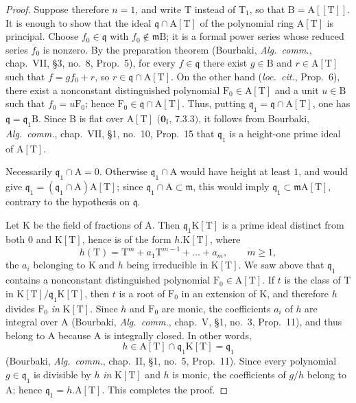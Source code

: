 \begin{proof}
Suppose therefore $n=1$, and write $\mathrm{T}$ instead of $\mathrm{T}_1$, so that $\mathrm{B}=\mathrm{A}[[\mathrm{T}]]$. It is enough to show that the ideal $\mathfrak{q}\cap\mathrm{A}[\mathrm{T}]$ of the polynomial ring $\mathrm{A}[\mathrm{T}]$ is principal.
Choose $f_0\in\mathfrak{q}$ with $f_0\notin\mathfrak{m}\mathrm{B}$; it is a formal power series whose reduced series $\overline{f}_0$ is nonzero. By the preparation theorem (Bourbaki, \emph{Alg.\ comm.}, chap.~VII, \S3, no.~8, Prop.~5), for every $f\in\mathfrak{q}$ there exist $g\in\mathrm{B}$ and $r\in\mathrm{A}[\mathrm{T}]$ such that $f=gf_0+r$, so $r\in\mathfrak{q}\cap\mathrm{A}[\mathrm{T}]$. On the other hand (\emph{loc.\ cit.}, Prop.~6), there exist a nonconstant distinguished polynomial $\mathrm{F}_0\in\mathrm{A}[\mathrm{T}]$ and a unit $u\in\mathrm{B}$ such that $f_0=u\mathrm{F}_0$; hence $\mathrm{F}_0\in\mathfrak{q}\cap\mathrm{A}[\mathrm{T}]$. Thus, putting $\mathfrak{q}_1=\mathfrak{q}\cap\mathrm{A}[\mathrm{T}]$, one has $\mathfrak{q}=\mathfrak{q}_1\mathrm{B}$. Since $\mathrm{B}$ is flat over $\mathrm{A}[\mathrm{T}]$ $(\mathbf{0}_{\mathrm{I}}$, $7.3.3)$, it follows from Bourbaki, \emph{Alg.\ comm.}, chap.~VII, \S1, no.~10, Prop.~15 that $\mathfrak{q}_1$ is a height-one prime ideal of $\mathrm{A}[\mathrm{T}]$.

Necessarily $\mathfrak{q}_1\cap\mathrm{A}=0$. Otherwise $\mathfrak{q}_1\cap\mathrm{A}$ would have height at least $1$, and  would give $\mathfrak{q}_1=(\mathfrak{q}_1\cap\mathrm{A})\mathrm{A}[\mathrm{T}]$; since $\mathfrak{q}_1\cap\mathrm{A}\subset\mathfrak{m}$, this would imply $\mathfrak{q}_1\subset\mathfrak{m}\mathrm{A}[\mathrm{T}]$, contrary to the hypothesis on $\mathfrak{q}$.

Let $\mathrm{K}$ be the field of fractions of $\mathrm{A}$. Then $\mathfrak{q}_1\mathrm{K}[\mathrm{T}]$ is a prime ideal distinct from both $0$ and $\mathrm{K}[\mathrm{T}]$, hence is of the form $h.\mathrm{K}[\mathrm{T}]$, where
\[
  h(\mathrm{T})=\mathrm{T}^m+a_1\mathrm{T}^{m-1}+\ldots+a_m,
  \qquad m\geq1,
\]
the $a_i$ belonging to $\mathrm{K}$ and $h$ being irreducible in $\mathrm{K}[\mathrm{T}]$. We saw above that $\mathfrak{q}_1$ contains a nonconstant distinguished polynomial $\mathrm{F}_0\in\mathrm{A}[\mathrm{T}]$. If $t$ is the class of $\mathrm{T}$ in $\mathrm{K}[\mathrm{T}]/\mathfrak{q}_1\mathrm{K}[\mathrm{T}]$, then $t$ is a root of $\mathrm{F}_0$ in an extension of $\mathrm{K}$, and therefore $h$ divides $\mathrm{F}_0$ \emph{in} $\mathrm{K}[\mathrm{T}]$. Since $h$ and $\mathrm{F}_0$ are monic, the coefficients $a_i$ of $h$ are integral over $\mathrm{A}$ (Bourbaki, \emph{Alg.\ comm.}, chap.~V, \S1, no.~3, Prop.~11), and thus belong to $\mathrm{A}$ because $\mathrm{A}$ is integrally closed. In other words,
\[
  h\in\mathrm{A}[\mathrm{T}]\cap\mathfrak{q}_1\mathrm{K}[\mathrm{T}]=\mathfrak{q}_1
\]
(Bourbaki, \emph{Alg.\ comm.}, chap.~II, \S1, no.~5, Prop.~11). Since every polynomial $g\in\mathfrak{q}_1$ is divisible by $h$ \emph{in} $\mathrm{K}[\mathrm{T}]$ and $h$ is monic, the coefficients of $g/h$ belong to $\mathrm{A}$; hence $\mathfrak{q}_1=h.\mathrm{A}[\mathrm{T}]$. This completes the proof.
\end{proof}

